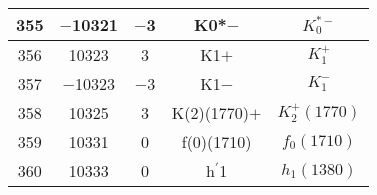 \documentclass{article}
\begin{document}
\begin{table}[!htbp]
\begin{tabular}{|c|c|c|c|c|}
\hline
355 & $-$10321 & $-$3 & K\underline{\hspace{0.6em}}0*$-$ & $K_{0}^{*-}$ \\
\hline
356 & 10323 & 3 & K\underline{\hspace{0.6em}}1$+$ & $K_1^{+}$ \\
\hline
357 & $-$10323 & $-$3 & K\underline{\hspace{0.6em}}1$-$ & $K_{1}^{-}$ \\
\hline
358 & 10325 & 3 & K(2)(1770)$+$ & $K_2^+(1770)$ \\
\hline
359 & 10331 & 0 & f(0)(1710) & $f_{0}(1710)$ \\
\hline
360 & 10333 & 0 & h$^{\prime}$\underline{\hspace{0.6em}}1 & $h_{1}(1380)$ \\
\hline
\end{tabular}
\end{table}

\clearpage
\end{document}
